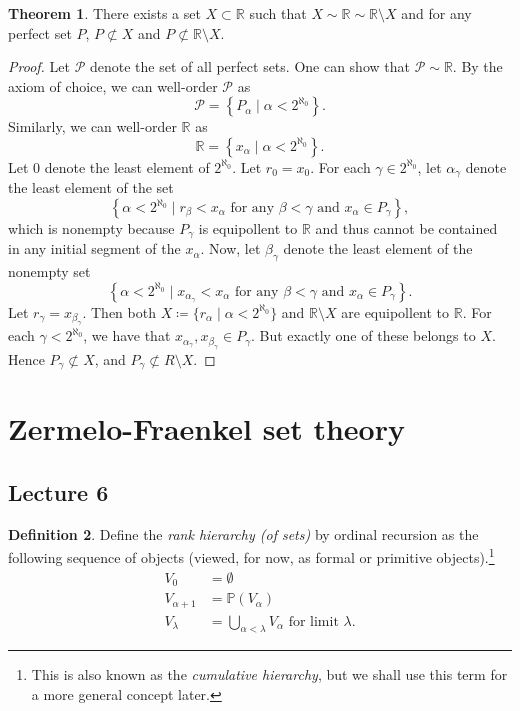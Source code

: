\documentclass[10pt,letterpaper,cm]{nupset}
\theoremstyle{definition}
\newtheorem{definition}{Definition}[subsection]
\theoremstyle{theorem}
\newtheorem{theorem}[definition]{Theorem}
\theoremstyle{remark}
\renewcommand{\P}{\mathbb P}
\newcommand{\R}{\mathbb R}
\newcommand{\1}{\mathbf{1}}
\newcommand{\0}{\vec 0}
\begin{document}
\begin{theorem}
There exists a set $X\subset \R$ such that $X \sim \R \sim \R \setminus X$ and for any perfect set $P$, $P\not\subset X$ and $P \not \subset \R \setminus X$.
\end{theorem}
\begin{proof}
Let $\mathcal{P}$ denote the set of all perfect sets. One can show that $\mathcal{P} \sim \R$. By the axiom of choice, we can well-order $\mathcal{P}$ as $$\mathcal{P} =\left\{P_{\alpha} \mid \alpha <2^{\aleph_0}\right\}.$$  Similarly, we can well-order $\R$ as $$\R =\left\{x_{\alpha}  \mid \alpha < 2^{\aleph_0}\right\}.$$
Let $0$ denote the least element of $2^{\aleph_0}$. Let $r_0 = x_0$. For each $\gamma \in 2^{\aleph_0}$, let $\alpha_{\gamma}$ denote the least element of the set $$\left\{\alpha < 2^{\aleph_0} \mid r_{\beta} < x_{\alpha} \text{ for any } \beta < \gamma \text{ and } x_{\alpha} \in P_{\gamma} \right\},$$ which is nonempty because $P_{\gamma}$ is equipollent to $\R$ and thus cannot be contained in any initial segment of the $x_{\alpha}$. Now, let $\beta_{\gamma}$ denote the least element of the nonempty set $$ \left\{\alpha < 2^{\aleph_0} \mid x_{\alpha_{\gamma}} < x_{\alpha} \text{ for any } \beta < \gamma \text{ and } x_{\alpha} \in P_{\gamma}\right\}    .$$  Let $r_{\gamma} =x_{\beta_{\gamma}}$. Then both $X\coloneqq \{r_{\alpha} \mid \alpha < 2^{\aleph_0}\}$ and $\R\setminus X$ are equipollent to $\R$. For each $\gamma < 2^{\aleph_0}$, we have that $x_{\alpha_{\gamma}}, x_{\beta_{\gamma}} \in P_{\gamma}$. But exactly one of these belongs to $X$. Hence $P_{\gamma} \not \subset X$, and $P_{\gamma} \not \subset R\setminus X$.
\end{proof}

\section{Zermelo-Fraenkel set theory}

\subsection{Lecture 6}

\begin{definition}
Define the \textit{rank hierarchy (of sets)} by ordinal recursion as the following sequence of objects (viewed, for now, as formal or primitive objects).\footnote{This is also known as the \textit{cumulative hierarchy}, but we shall use this term for a more general concept later.}
\begin{align*}
V_0 & = \emptyset
\\ V_{\alpha +1} & = \P(V_{\alpha})
\\ V_{\lambda} & = \bigcup_{\alpha < \lambda} V_{\alpha} \text{ for limit $\lambda$}.
\end{align*} 
\end{definition}
\end{document}
